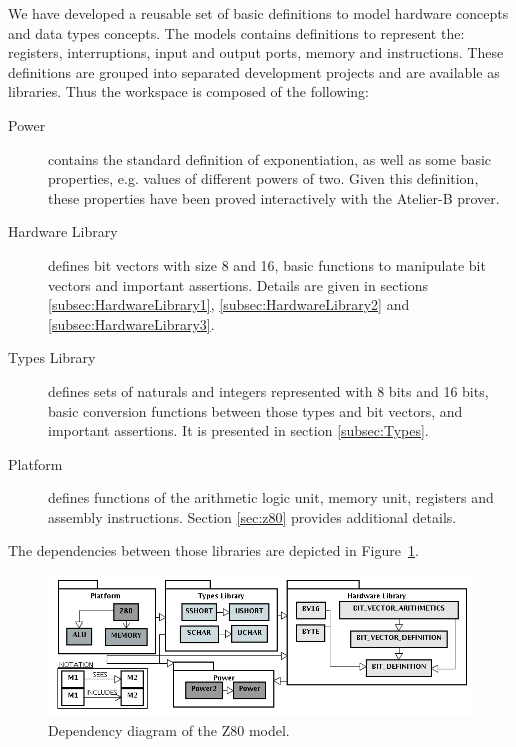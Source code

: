 \documentclass[a4paper]{llncs}
\begin{document}
We have developed a reusable set of basic definitions to model
hardware concepts and data types concepts. The models contains
definitions to represent the: registers, interruptions, input and
output ports, memory and instructions. These definitions are grouped
into separated development projects and are available as libraries.
Thus the workspace is composed of the following: 
\begin{description}

\item[Power] contains the standard definition of exponentiation, as
  well as some basic properties, e.g. values of different powers of
  two. Given this definition, these properties have been proved
  interactively with the Atelier-B prover.

\item[Hardware Library] defines bit vectors with size 8 and 16, basic
  functions to manipulate bit vectors and important
  assertions. Details are given in sections
  \ref{subsec:HardwareLibrary1}, \ref{subsec:HardwareLibrary2} and
  \ref{subsec:HardwareLibrary3}.
 
\item[Types Library] defines sets of naturals and integers represented
  with 8 bits and 16 bits, basic conversion functions between those
  types and bit vectors, and important assertions. It is presented in
  section \ref{subsec:Types}.
 
\item[Platform] defines functions of the arithmetic logic unit, memory
  unit, registers and assembly instructions. Section \ref{sec:z80}
  provides additional details.
 
\end{description}

The dependencies between those libraries are depicted in
Figure~\ref{fig:hardware-definition-graph}.

\begin{figure}[h]
\centering
\includegraphics[width=.77\textwidth]{diagramaEstrutural_vertical_ProB.png}
 \caption{Dependency diagram of the Z80 model.}
\label{fig:hardware-definition-graph}
\end{figure}
\end{document}
